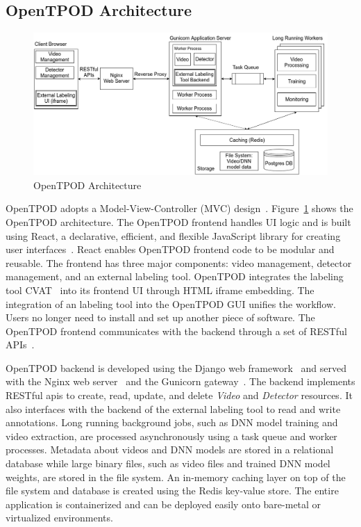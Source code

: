 \subsection{OpenTPOD Architecture}

\begin{figure}[]
  \hspace{-.1in}
  \includegraphics[width=1.1\textwidth]{FIGS/tpod-arch}
  \caption{OpenTPOD Architecture}
  \label{figs:tpod-arch}
\end{figure}

OpenTPOD adopts a Model-View-Controller (MVC) design~\cite{krasner1988description}.
Figure~\ref{figs:tpod-arch} shows the OpenTPOD architecture. The OpenTPOD frontend
handles UI logic and is built using React, a declarative, efficient, and
flexible JavaScript library for creating user interfaces~\cite{staff2016react}.
React enables OpenTPOD frontend code to be modular and reusable. The frontend has
three major components: video management, detector management, and an external
labeling tool. OpenTPOD integrates the labeling tool CVAT~\cite{cvat2019} into its
frontend UI through HTML iframe embedding. The integration of an labeling tool
into the OpenTPOD GUI unifies the workflow. Users no longer need to install and set
up another piece of software. The OpenTPOD frontend communicates with the backend
through a set of RESTful APIs~\cite{richardson2008restful}.

OpenTPOD backend is developed using the Django web
framework~\cite{holovaty2009definitive} and served with the Nginx web
server~\cite{nedelcu2010nginx} and the Gunicorn gateway~\cite{gunicorn2017http}.
The backend implements RESTful apis to create, read, update, and delete
\textit{Video} and \textit{Detector} resources. It also interfaces with the
backend of the external labeling tool to read and write annotations. Long
running background jobs, such as DNN model training and video extraction, are
processed asynchronously using a task queue and worker processes. Metadata about
videos and DNN models are stored in a relational database while large binary
files, such as video files and trained DNN model weights, are stored in the file
system. An in-memory caching layer on top of the file system and database is
created using the Redis key-value store. The entire application is containerized and
can be deployed easily onto bare-metal or virtualized environments.

